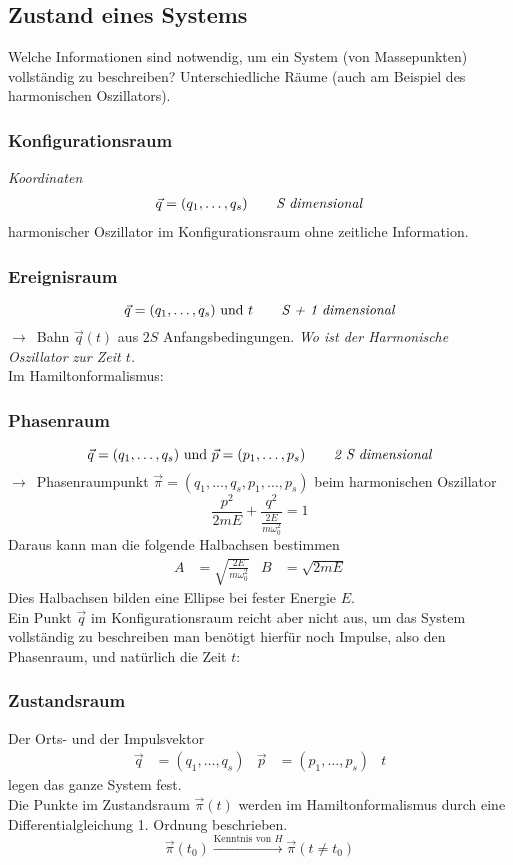 \documentclass[oneside]{book}
\theoremstyle{definition}
\newcommand{\conseq}{$\rightarrow$~}
\begin{document}
\subsection{Zustand eines Systems}
Welche Informationen sind notwendig, um ein System (von Massepunkten) vollständig zu beschreiben?
Unterschiedliche Räume (auch am Beispiel des harmonischen Oszillators).
\subsubsection{Konfigurationsraum} \textit{Koordinaten}
\begin{align*}
	\vec{q} = (q_1, \dots, q_s) \text{\textit{\qquad S dimensional}}
\end{align*}
harmonischer Oszillator im Konfigurationsraum ohne zeitliche Information.

\subsubsection{Ereignisraum}
$$\vec{q} = (q_1, \dots, q_s) \text{~und~} t \text{\textit{\qquad S + 1 dimensional}}$$
\conseq Bahn $\vec{q}(t)$ aus $2S$ Anfangsbedingungen. \textit{Wo ist der Harmonische Oszillator zur Zeit $t$.}\\

Im Hamiltonformalismus:

\subsubsection{Phasenraum}
$$\vec{q} = (q_1, \dots, q_s) \text{~und~} \vec{p} = (p_1, \dots, p_s) \text{\textit{\qquad 2 S dimensional}}$$
\conseq Phasenraumpunkt $\vec{\pi} = (q_1, \dots, q_s, p_1, \dots, p_s)$
beim harmonischen Oszillator
$$\frac{p^2}{2 m E} + \frac{q^2}{\frac{2 E}{m \omega_0^2}} = 1$$
Daraus kann man die folgende Halbachsen bestimmen
\begin{align*}
A &= \sqrt{\frac{2 E}{m \omega_0^2}}  &   B &= \sqrt{2 m E}
\end{align*}
Dies Halbachsen bilden eine Ellipse bei fester Energie $E$.\\
Ein Punkt $\vec{q}$ im Konfigurationsraum reicht aber nicht aus, um das System vollständig zu beschreiben man benötigt hierfür noch Impulse, also den Phasenraum, und natürlich die Zeit $t$:

\subsubsection{Zustandsraum}
Der Orts- und der Impulsvektor
\begin{align*}
	\vec{q} &= (q_1, \dots, q_s) & \vec{p} &= (p_1, \dots, p_s) & t
\end{align*}
legen das ganze System fest.\\
Die Punkte im Zustandsraum $\vec{\pi} (t)$ werden im Hamiltonformalismus durch eine Differentialgleichung 1. Ordnung beschrieben.
$$\vec{\pi}(t_0) \xrightarrow{\text{Kenntnis von $H$}} \vec{\pi}(t \neq t_0)$$
\end{document}
